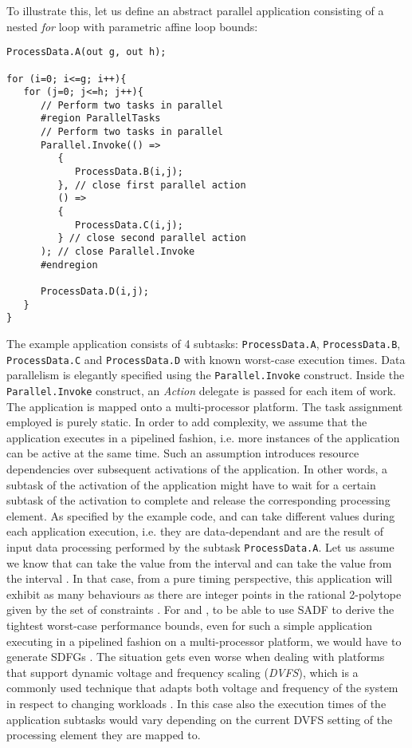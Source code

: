 \documentclass[]{eptcs}
\begin{document}
To illustrate this, let us define an abstract parallel application consisting of a nested \textit{for} loop with parametric affine loop bounds:
\begin{verbatim}
ProcessData.A(out g, out h);

for (i=0; i<=g; i++){
   for (j=0; j<=h; j++){
      // Perform two tasks in parallel
      #region ParallelTasks
      // Perform two tasks in parallel
      Parallel.Invoke(() =>
         {
            ProcessData.B(i,j);
         }, // close first parallel action
         () =>
         {
            ProcessData.C(i,j);	
         } // close second parallel action
      ); // close Parallel.Invoke
      #endregion

      ProcessData.D(i,j);
   }
}
\end{verbatim}
The example application consists of 4 subtasks: {\tt ProcessData.A}, {\tt ProcessData.B}, {\tt ProcessData.C}
and {\tt ProcessData.D} with known worst-case execution times. Data parallelism is elegantly specified using the {\tt Parallel.Invoke} construct. Inside the {\tt Parallel.Invoke} construct, an \textit{Action} delegate is passed for each item of work. The application is mapped onto a multi-processor platform. The task assignment employed is purely static. In order to add complexity, we assume that the application executes in a pipelined fashion, i.e. more instances of the application can be active at the same time. Such an assumption introduces resource dependencies over subsequent activations of the application. In other words, a subtask of the  activation of the application might have to wait for a certain subtask of the  activation to complete and release the corresponding processing element. As specified by the example code,  and  can take different values during each application execution, i.e. they are data-dependant and are the result of input data processing performed by the subtask  {\tt ProcessData.A}. Let us assume we know that  can take the value from the interval  and  can take the value from the interval  . In that case, from a pure timing perspective, this application will exhibit as many behaviours as there are integer points in the rational 2-polytope  given by the set of constraints . For  and , to be able to use SADF to derive the tightest worst-case performance  bounds, even for such a simple application executing in a pipelined fashion on a multi-processor platform, we would have to generate  SDFGs \cite{2caluss:all}. The situation gets even worse when dealing with platforms that support dynamic voltage and frequency scaling (\textit{DVFS}), which is a commonly used technique that adapts both voltage and frequency of the system in respect to changing workloads \cite{2mack:all}. In this case also the execution times of the application subtasks would vary depending on the current DVFS setting of the processing element they are mapped to.
\end{document}
